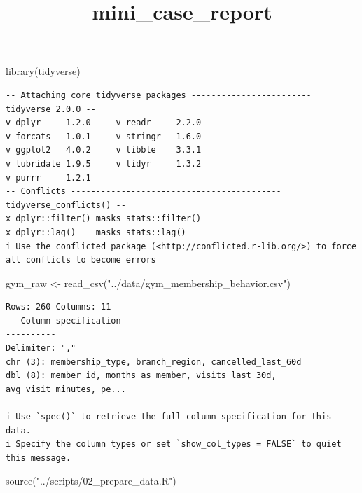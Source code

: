 \documentclass[
  letterpaper,
  DIV=11,
  numbers=noendperiod]{scrartcl}
\title{mini\_case\_report}
\author{}
\date{}
\newenvironment{Shaded}{\begin{snugshade}}{\end{snugshade}}
\newcommand{\FunctionTok}[1]{\textcolor[rgb]{0.28,0.35,0.67}{#1}}
\newcommand{\NormalTok}[1]{\textcolor[rgb]{0.00,0.23,0.31}{#1}}
\newcommand{\OtherTok}[1]{\textcolor[rgb]{0.00,0.23,0.31}{#1}}
\newcommand{\StringTok}[1]{\textcolor[rgb]{0.13,0.47,0.30}{#1}}
\begin{document}
\maketitle


\begin{Shaded}
\begin{Highlighting}[]
\FunctionTok{library}\NormalTok{(tidyverse)}
\end{Highlighting}
\end{Shaded}

\begin{verbatim}
-- Attaching core tidyverse packages ------------------------ tidyverse 2.0.0 --
v dplyr     1.2.0     v readr     2.2.0
v forcats   1.0.1     v stringr   1.6.0
v ggplot2   4.0.2     v tibble    3.3.1
v lubridate 1.9.5     v tidyr     1.3.2
v purrr     1.2.1     
-- Conflicts ------------------------------------------ tidyverse_conflicts() --
x dplyr::filter() masks stats::filter()
x dplyr::lag()    masks stats::lag()
i Use the conflicted package (<http://conflicted.r-lib.org/>) to force all conflicts to become errors
\end{verbatim}

\begin{Shaded}
\begin{Highlighting}[]
\NormalTok{gym\_raw }\OtherTok{\textless{}{-}} \FunctionTok{read\_csv}\NormalTok{(}\StringTok{"../data/gym\_membership\_behavior.csv"}\NormalTok{)}
\end{Highlighting}
\end{Shaded}

\begin{verbatim}
Rows: 260 Columns: 11
-- Column specification --------------------------------------------------------
Delimiter: ","
chr (3): membership_type, branch_region, cancelled_last_60d
dbl (8): member_id, months_as_member, visits_last_30d, avg_visit_minutes, pe...

i Use `spec()` to retrieve the full column specification for this data.
i Specify the column types or set `show_col_types = FALSE` to quiet this message.
\end{verbatim}

\begin{Shaded}
\begin{Highlighting}[]
\FunctionTok{source}\NormalTok{(}\StringTok{"../scripts/02\_prepare\_data.R"}\NormalTok{)}
\end{Highlighting}
\end{Shaded}
\end{document}
